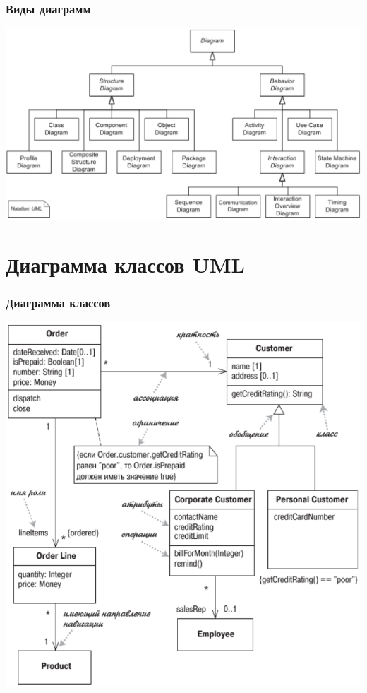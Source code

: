 \documentclass{../mcsslides}
\begin{document}
    \begin{frame}
        \frametitle{Виды диаграмм}
        \begin{center}
            \includegraphics[width=\textwidth]{umlDiagrams.png}
        \end{center}
    \end{frame}

    \section{Диаграмма классов UML}

    \begin{frame}
        \frametitle{Диаграмма классов}
        \begin{center}
            \includegraphics[height=0.8\textheight]{umlClassDiagram.png}
        \end{center}
    \end{frame}
\end{document}
